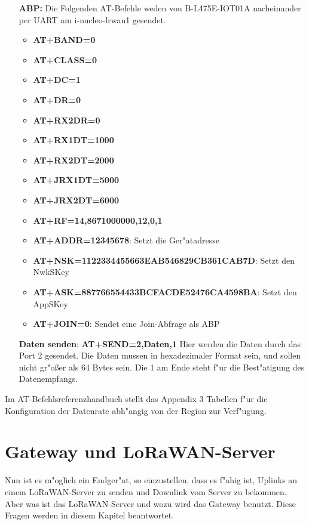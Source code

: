 \begin{itemize}
	\item[\textbf{ABP:}] Die Folgenden AT-Befehle weden von
	B-L475E-IOT01A nacheinander  per UART am i-nucleo-lrwan1 gesendet.
	\begin{itemize}
		\item \textbf{AT+BAND=0}
		\item \textbf{AT+CLASS=0} 
		\item \textbf{AT+DC=1}
		\item \textbf{AT+DR=0} 
		\item \textbf{AT+RX2DR=0}
		\item \textbf{AT+RX1DT=1000} 
		\item \textbf{AT+RX2DT=2000} 
		\item \textbf{AT+JRX1DT=5000}
		\item \textbf{AT+JRX2DT=6000} 
		\item \textbf{AT+RF=14,8671000000,12,0,1}
		\item \textbf{AT+ADDR=12345678}: Setzt die Ger"atadresse 
		\item \textbf{AT+NSK=1122334455663EAB546829CB361CAB7D}: Setzt
		den NwkSKey
		\item \textbf{AT+ASK=887766554433BCFACDE52476CA4598BA}: Setzt
		den AppSKey 
		\item \textbf{AT+JOIN=0}: Sendet eine Join-Abfrage als ABP
	\end{itemize}

	\item[\textbf{Daten senden}:] \textbf{AT+SEND=2,Daten,1}
	Hier werden die Daten durch das Port 2 gesendet. Die Daten mussen in
	hexadezimaler Format sein, und sollen nicht gr"o\ss{}er als 64 Bytes
	sein. Die 1 am Ende steht f"ur die Best"atigung des Datenempfangs. 
	
\end{itemize}

Im AT-Befehlsreferenzhandbuch stellt das Appendix 3 Tabellen f"ur die
Konfiguration der Datenrate abh"angig von der Region zur Verf"ugung.

\chapter{Gateway und LoRaWAN-Server}\label{G_S}

Nun ist es m"oglich ein Endger"at, so einzustellen, dass es f"ahig ist,
Uplinks an einem LoRaWAN-Server zu senden und Downlink vom Server zu
bekommen. Aber was ist das LoRaWAN-Server und wozu wird das Gateway
benutzt. Diese Fragen werden in diesem Kapitel beantwortet.

